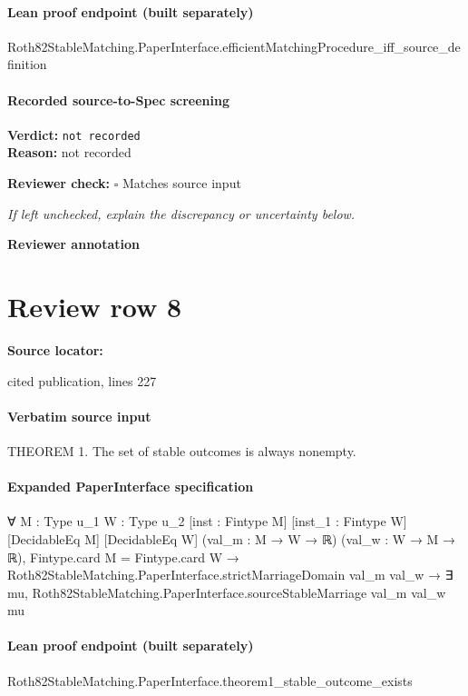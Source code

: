 \documentclass[10pt]{article}
\newcommand{\reviewerbox}{%
  \par\noindent\fbox{\parbox{0.96\linewidth}{\rule{0pt}{0.38in}}}\par
}
\newcommand{\reviewmatch}[1]{%
  \par\noindent\textbf{Reviewer check:} $\square$\; #1\par
  \noindent\emph{If left unchecked, explain the discrepancy or uncertainty below.}\par
}
\begin{document}
\paragraph{Lean proof endpoint (built separately)}\begin{ReviewVerbatim}
Roth82StableMatching.PaperInterface.efficientMatchingProcedure_iff_source_definition
\end{ReviewVerbatim}

\paragraph{Recorded source-to-Spec screening}
\textbf{Verdict:} \texttt{not recorded}
\\
\textbf{Reason:} not recorded
\reviewmatch{Matches source input}
\noindent\textbf{Reviewer annotation}\par
\reviewerbox
\clearpage
\hypertarget{source-claim-28dc2b89f44923a5}{}
\section*{Review row 8}
\textbf{Source locator:} {\footnotesize\raggedright cited publication, lines 227\par}
\paragraph{Verbatim source input}
\begin{ReviewVerbatim}
THEOREM 1. The set of stable outcomes is always nonempty.
\end{ReviewVerbatim}


\paragraph{Expanded PaperInterface specification}
\begin{ReviewVerbatim}
∀ {M : Type u_1} {W : Type u_2} [inst : Fintype M] [inst_1 : Fintype W] [DecidableEq M] [DecidableEq W]
  (val_m : M → W → ℝ) (val_w : W → M → ℝ),
  Fintype.card M = Fintype.card W →
    Roth82StableMatching.PaperInterface.strictMarriageDomain val_m val_w →
      ∃ mu, Roth82StableMatching.PaperInterface.sourceStableMarriage val_m val_w mu
\end{ReviewVerbatim}

\paragraph{Lean proof endpoint (built separately)}\begin{ReviewVerbatim}
Roth82StableMatching.PaperInterface.theorem1_stable_outcome_exists
\end{ReviewVerbatim}
\end{document}
